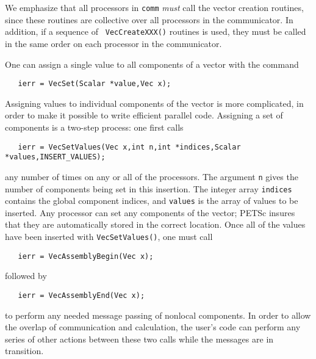 We emphasize that all processors in {\tt comm} {\em must} call the
vector creation routines, since these routines are collective over all
processors in the communicator.  In addition, if a sequence of {\tt
VecCreateXXX()} routines is used, they must be called in the same
order on each processor in the communicator.

One can assign a single value to all components of a vector with the 
command 
\begin{verbatim}
   ierr = VecSet(Scalar *value,Vec x);
\end{verbatim}
Assigning values to individual components of the vector is more 
complicated, in order to make it possible to write efficient parallel 
code.  Assigning a set of components is a two-step process: one 
first calls   
\begin{verbatim}
   ierr = VecSetValues(Vec x,int n,int *indices,Scalar *values,INSERT_VALUES);
\end{verbatim}
any number of times on any or all of the processors. The argument
{\tt n} gives the number of components being set in this 
insertion. The integer array {\tt indices} contains the global component
indices, and {\tt values} is the array of values to be inserted.
Any processor can set any components of the vector; PETSc insures that 
they are automatically stored in the correct location.
Once all of the values have been inserted with {\tt VecSetValues()},
one must call 
\begin{verbatim}
   ierr = VecAssemblyBegin(Vec x);
\end{verbatim}
followed by  
\begin{verbatim}
   ierr = VecAssemblyEnd(Vec x);
\end{verbatim}
to perform any needed message passing of nonlocal components.
In order to allow the overlap of communication and calculation,
the user's code can perform any series of other actions between these 
two calls while the messages are in transition. 

